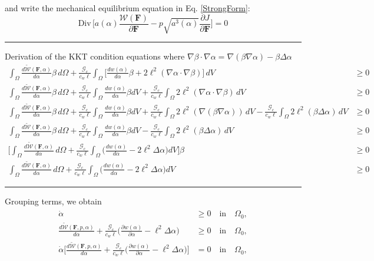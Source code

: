 \documentclass[12pt,3p]{article}
\numberwithin{equation}{section}
\begin{document}
and write the mechanical equilibrium equation in Eq. \ref{StrongForm}:
\begin{equation}\label{Eqm}
\text{Div} \, \bigg[ a(\alpha) \frac{\mathcal{W}(\mathbf{F})}{\partial \mathbf{F}} - p \sqrt{a^3(\alpha)} \frac{\partial J}{\partial \mathbf{F}} \bigg] = 0 
\end{equation}
\noindent\rule{\linewidth}{0.5pt} %
Derivation of the KKT condition equations where $\nabla \beta \cdot \nabla \alpha = \nabla (\beta \nabla \alpha) - \beta \Delta \alpha$
\begin{align*}
\int_\Omega \frac{d \widetilde{\mathcal{W}}(\mathbf{F}, \alpha)}{d \alpha} \beta \, d\Omega + \frac{\mathcal{G}_c}{c_w \ell} \int_\Omega \bigg[ \frac{d w(\alpha)}{d \alpha} \beta + 2 \ell^2 (\nabla \alpha \cdot \nabla \beta) \bigg] \, dV &\geq 0 \\
\int_\Omega \frac{d \widetilde{\mathcal{W}}(\mathbf{F}, \alpha)}{d \alpha} \beta \, d\Omega + \frac{\mathcal{G}_c}{c_w \ell} \int_\Omega \frac{d w(\alpha)}{d \alpha} \beta dV + \frac{\mathcal{G}_c}{c_w \ell} \int_{\Omega} 2 \ell^2 (\nabla \alpha \cdot \nabla \beta)  \, dV &\geq 0 \\
\int_\Omega \frac{d \widetilde{\mathcal{W}}(\mathbf{F}, \alpha)}{d \alpha} \beta \, d\Omega +  \frac{\mathcal{G}_c}{c_w \ell} \int_\Omega \frac{d w(\alpha)}{d \alpha} \beta dV + \frac{\mathcal{G}_c}{c_w \ell} \int_{\Omega} 2 \ell^2 ( \nabla (\beta \nabla \alpha))  \, dV - \frac{\mathcal{G}_c}{c_w \ell} \int_{\Omega} 2 \ell^2 (\beta \Delta \alpha)  \, dV &\geq 0 \\
\int_\Omega \frac{d \widetilde{\mathcal{W}}(\mathbf{F}, \alpha)}{d \alpha} \beta \, d\Omega +  \frac{\mathcal{G}_c}{c_w \ell} \int_\Omega \frac{d w(\alpha)}{d \alpha} \beta dV  - \frac{\mathcal{G}_c}{c_w \ell} \int_{\Omega} 2 \ell^2 (\beta \Delta \alpha)  \, dV &\geq 0 \\
\bigg[ \int_\Omega \frac{d \widetilde{\mathcal{W}}(\mathbf{F}, \alpha)}{d \alpha} \, d\Omega +  \frac{\mathcal{G}_c}{c_w \ell} \int_\Omega \bigg( \frac{d w(\alpha)}{d \alpha}  - 2 \ell^2 \Delta \alpha\bigg) dV \bigg] \beta &\geq 0 \\
\int_\Omega \frac{d \widetilde{\mathcal{W}}(\mathbf{F}, \alpha)}{d \alpha} \, d\Omega +  \frac{\mathcal{G}_c}{c_w \ell} \int_\Omega \bigg( \frac{d w(\alpha)}{d \alpha}  - 2 \ell^2 \Delta \alpha\bigg) dV &\geq 0 
\end{align*}
\noindent\rule{\linewidth}{0.5pt} %
Grouping terms, we obtain
\begin{align}
\begin{split}
\dot{\alpha} &\geq 0 \quad \text{in} \quad \Omega_0, \\
\frac{d \widetilde{\mathcal{W}}(\mathbf{F}, p, \alpha)}{d \alpha} + \frac{\mathcal{G}_c}{c_w \ell}  \bigg( \frac{\partial w(\alpha)}{\partial \alpha}  - \ell^2 \Delta \alpha\bigg) &\geq 0 \quad \text{in} \quad \Omega_0, \\
\dot{\alpha} \bigg[ \frac{d \widetilde{\mathcal{W}}(\mathbf{F}, p, \alpha)}{d \alpha} + \frac{\mathcal{G}_c}{c_w \ell}  \bigg( \frac{\partial w(\alpha)}{\partial \alpha}  - \ell^2 \Delta \alpha\bigg) \bigg] &= 0 \quad \text{in} \quad \Omega_0,
\end{split}
\end{align}
\end{document}
